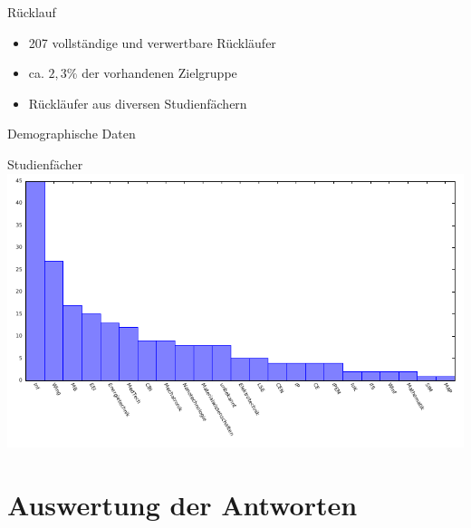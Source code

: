 \documentclass[]{beamer}
\begin{document}
\begin{frame}{Rücklauf}
	\begin{itemize}
		\item 207 vollständige und verwertbare Rückläufer
		\item ca. $2,3\%$ der vorhandenen Zielgruppe
		\item Rückläufer aus diversen Studienfächern
	\end{itemize}
\end{frame}

\begin{frame}{Demographische Daten}
	\begin{center}
		Studienfächer
	\includegraphics[scale=0.9]{plots/stud.pdf}
	\end{center}
\end{frame}

\section{Auswertung der Antworten}
\end{document}
